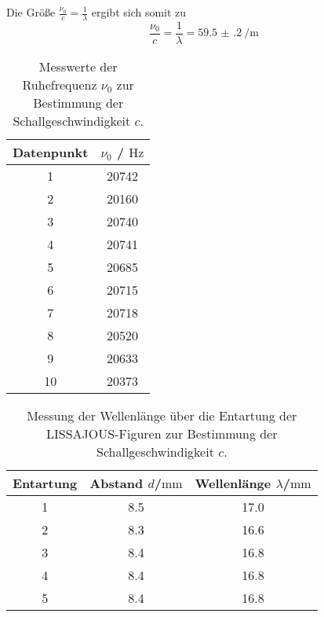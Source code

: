 Die Größe $\frac{\nu_0}{c}=\frac{1}{\lambda}$ ergibt sich somit zu
\begin{equation}
	\label{eqn:wichtige_größe}
	\frac{\nu_0}{c}=\frac{1}{\lambda}=\SI{59.5(2)}{\per\meter}
\end{equation}


\begin{table}
	\centering
	\caption{Messwerte der Ruhefrequenz $\nu_{\mathrm{0}}$ zur Bestimmung der Schallgeschwindigkeit $c$.}
	\label{tab:ruhefrequenz}
	\begin{tabular}{cc}
		\toprule
		Datenpunkt & $\nu_0$ / $\si{\hertz}$ \\
		\midrule
		1          & 20742                   \\
		2          & 20160                   \\
		3          & 20740                   \\
		4          & 20741                   \\
		5          & 20685                   \\
		6          & 20715                   \\
		7          & 20718                   \\
		8          & 20520                   \\
		9          & 20633                   \\
		10         & 20373                   \\
		\bottomrule
	\end{tabular}

\end{table}

\begin{table}
	\centering
	\caption{Messung der Wellenlänge über die Entartung der LISSAJOUS-Figuren zur Bestimmung der Schallgeschwindigkeit $c$.}
	\label{tab:juice}
	\begin{tabular}{ccc}
		\toprule
		Entartung & Abstand $d$/$\si{\milli\meter}$ & Wellenlänge $\lambda$/$\si{\milli\meter}$ \\
		\midrule
		1         & 8.5                             & 17.0                                       \\
		2         & 8.3                             & 16.6                                       \\
		3         & 8.4                             & 16.8                                       \\
		4         & 8.4                             & 16.8                                       \\
		5         & 8.4                             & 16.8                                       \\
		\bottomrule
	\end{tabular}
\end{table}
\FloatBarrier
